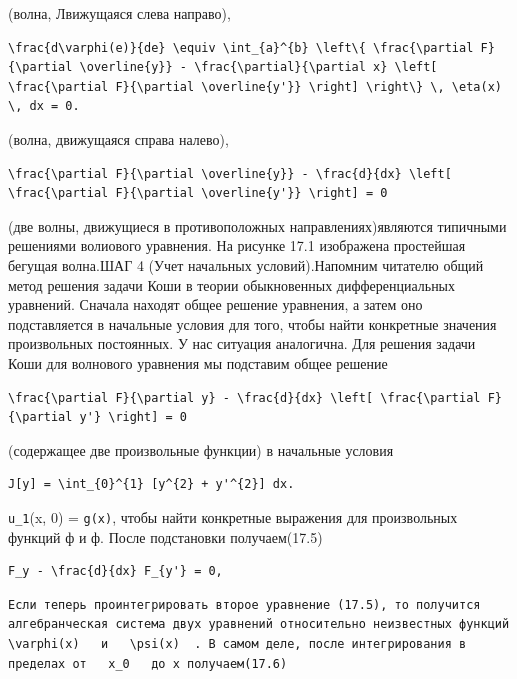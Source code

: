 \documentclass[
  ukrainian,
]{article}
\begin{document}
(волна, Лвижущаяся слева направо),

\begin{verbatim}
\frac{d\varphi(e)}{de} \equiv \int_{a}^{b} \left\{ \frac{\partial F}{\partial \overline{y}} - \frac{\partial}{\partial x} \left[ \frac{\partial F}{\partial \overline{y'}} \right] \right\} \, \eta(x) \, dx = 0.
\end{verbatim}

(волна, движущаяся справа налево),

\begin{verbatim}
\frac{\partial F}{\partial \overline{y}} - \frac{d}{dx} \left[ \frac{\partial F}{\partial \overline{y'}} \right] = 0
\end{verbatim}

(две волны, движущиеся в противоположных направлениях)являются типичными
решениями волиового уравнения. На рисунке 17.1 изображена простейшая
бегущая волна.ШАГ 4 (Учет начальных условий).Напомним читателю общий
метод решения задачи Коши в теории обыкновенных дифференциальных
уравнений. Сначала находят общее решение уравнения, а затем оно
подставляется в начальные условия для того, чтобы найти конкретные
значения произвольных постоянных. У нас ситуация аналогична. Для решения
задачи Коши для волнового уравнения мы подставим общее решение

\begin{verbatim}
\frac{\partial F}{\partial y} - \frac{d}{dx} \left[ \frac{\partial F}{\partial y'} \right] = 0
\end{verbatim}

(содержащее две произвольные функции) в начальные условия

\begin{verbatim}
J[y] = \int_{0}^{1} [y^{2} + y'^{2}] dx.
\end{verbatim}

\texttt{u\_1}(x, 0) = \texttt{g(x)}, чтобы найти конкретные выражения
для произвольных функций ф и ф. После подстановки получаем(17.5)

\begin{verbatim}
F_y - \frac{d}{dx} F_{y'} = 0,
\end{verbatim}

\begin{verbatim}
Если теперь проинтегрировать второе уравнение (17.5), то получится алгебранческая система двух уравнений относительно неизвестных функций   \varphi(x)   и   \psi(x)  . В самом деле, после интегрирования в пределах от   x_0   до x получаем(17.6)
\end{verbatim}
\end{document}
